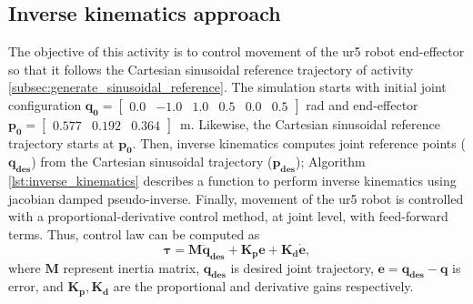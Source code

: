 \graphicspath{{images/act_1.3/}}
\subsection{Inverse kinematics approach}
\label{subsec:inverse_kinematics_approach}
The objective of this activity is to control movement of the ur5 robot end-effector so that it follows the Cartesian sinusoidal reference trajectory of activity \ref{subsec:generate_sinusoidal_reference}. The simulation starts with initial joint configuration $\mathbf{q_0}=\begin{bmatrix} 0.0 & -1.0 & 1.0 & 0.5 & 0.0 & 0.5 \end{bmatrix}$ rad and end-effector $\mathbf{p_0}=\begin{bmatrix}  0.577 &   0.192 &   0.364 \end{bmatrix}$~m. Likewise, the Cartesian sinusoidal reference trajectory starts at $\mathbf{p_0}$. Then, inverse kinematics computes joint reference points ($\mathbf{q_{des}}$) from the Cartesian sinusoidal trajectory ($\mathbf{p_{des}}$); Algorithm \ref{lst:inverse_kinematics} describes a function to perform inverse kinematics using jacobian damped pseudo-inverse. Finally, movement of the ur5 robot is controlled with a proportional-derivative control method, at joint level, with feed-forward terms. Thus, control law can be computed as 
\begin{equation}
	\boldsymbol{\tau}
	=\mathbf{M}\mathbf{\ddot{q}_{des}} + \mathbf{K_p e} + \mathbf{K_d \dot{e}},
	\label{eq:pd_critical_damping}
\end{equation}
\noindent where $\mathbf{M}$ represent inertia matrix, $\mathbf{{q}_{des}}$ is desired joint trajectory, $\mathbf{e}=\mathbf{q_{des} - q}$ is error, and $\mathbf{K_p, K_d}$ are the proportional and derivative gains respectively. \vspace{.5cm}

